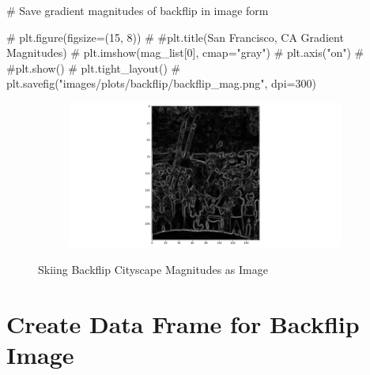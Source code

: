 \documentclass[
  letterpaper,
  DIV=11,
  numbers=noendperiod]{scrreprt}
\newenvironment{Shaded}{\begin{snugshade}}{\end{snugshade}}
\newcommand{\CommentTok}[1]{\textcolor[rgb]{0.37,0.37,0.37}{#1}}
\begin{document}
\begin{Shaded}
\begin{Highlighting}[]
\CommentTok{\# Save gradient magnitudes of backflip in image form}

\CommentTok{\# plt.figure(figsize=(15, 8))}
\CommentTok{\# \#plt.title(\textquotesingle{}San Francisco, CA Gradient Magnitudes\textquotesingle{})}
\CommentTok{\# plt.imshow(mag\_list[0], cmap="gray")}
\CommentTok{\# plt.axis("on")}
\CommentTok{\# \#plt.show()}
\CommentTok{\# plt.tight\_layout()}
\CommentTok{\# plt.savefig("images/plots/backflip/backflip\_mag.png", dpi=300)}
\end{Highlighting}
\end{Shaded}

\begin{figure}

\begin{minipage}{\linewidth}

\begin{figure}[H]

{\centering \includegraphics{images/plots/backflip/backflip_mag.png}

}


\end{figure}%

\end{minipage}%

\caption{\label{fig-backflip-mags}Skiing Backflip Cityscape Magnitudes
as Image}

\end{figure}%

\section{Create Data Frame for Backflip
Image}\label{create-data-frame-for-backflip-image}
\end{document}
